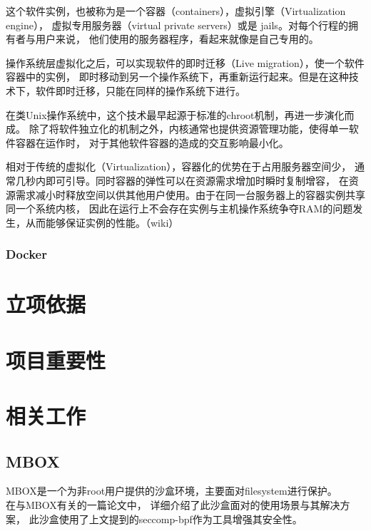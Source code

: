 \documentclass[AutoFakeBold,a4paper]{ctexart}
\begin{document}
这个软件实例，也被称为是一个容器（containers），虚拟引擎（Virtualization engine），
虚拟专用服务器（virtual private servers）或是 jails。对每个行程的拥有者与用户来说，
他们使用的服务器程序，看起来就像是自己专用的。

操作系统层虚拟化之后，可以实现软件的即时迁移（Live migration），使一个软件容器中的实例，
即时移动到另一个操作系统下，再重新运行起来。但是在这种技术下，软件即时迁移，只能在同样的操作系统下进行。

在类Unix操作系统中，这个技术最早起源于标准的chroot机制，再进一步演化而成。
除了将软件独立化的机制之外，内核通常也提供资源管理功能，使得单一软件容器在运作时，
对于其他软件容器的造成的交互影响最小化。

相对于传统的虚拟化（Virtualization），容器化的优势在于占用服务器空间少，
通常几秒内即可引导。同时容器的弹性可以在资源需求增加时瞬时复制增容，
在资源需求减小时释放空间以供其他用户使用。由于在同一台服务器上的容器实例共享同一个系统内核，
因此在运行上不会存在实例与主机操作系统争夺RAM的问题发生，从而能够保证实例的性能。（wiki）
\subsubsection{Docker}




\section{立项依据}

\section{项目重要性}

\section{相关工作}



\subsection{MBOX}
MBOX是一个为非root用户提供的沙盒环境，主要面对filesystem进行保护。\\

在与MBOX有关的一篇论文\cite{180196}中，
详细介绍了此沙盒面对的使用场景与其解决方案，
此沙盒使用了上文提到的seccomp-bpf作为工具增强其安全性。
\end{document}
